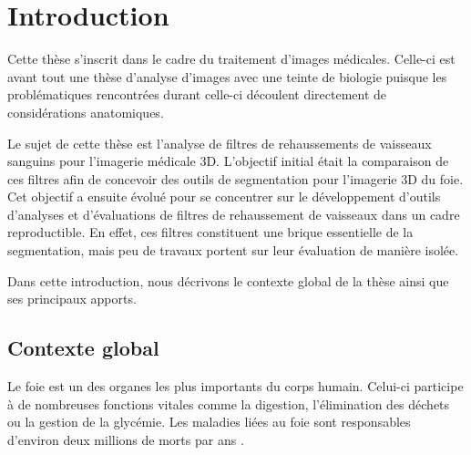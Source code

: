 %

\chapter{Introduction}
\label{sec:introduction}


Cette thèse s'inscrit dans le cadre du traitement d'images médicales. Celle-ci est avant tout une thèse d'analyse d'images avec une teinte de biologie puisque les problématiques rencontrées durant celle-ci découlent directement de considérations anatomiques.

Le sujet de cette thèse est l'analyse de filtres de rehaussements de vaisseaux sanguins pour l'imagerie médicale 3D. L'objectif initial était la comparaison de ces filtres afin de concevoir des outils de segmentation pour l'imagerie 3D du foie. Cet objectif a ensuite évolué pour se concentrer sur le développement d'outils d'analyses et d'évaluations de filtres de rehaussement de vaisseaux dans un cadre reproductible. En effet, ces filtres constituent une brique essentielle de la segmentation, mais peu de travaux portent sur leur évaluation de manière isolée.

Dans cette introduction, nous décrivons le contexte global de la thèse ainsi que ses principaux apports.

\section{Contexte global}

Le foie est un des organes les plus importants du corps humain. Celui-ci participe à de nombreuses fonctions vitales comme la digestion, l'élimination des déchets ou la gestion de la glycémie. Les maladies liées au foie sont responsables d'environ deux millions de morts par ans \cite{Asrani2019_liver_deseases}. 



